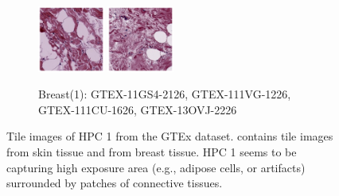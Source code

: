 \documentclass{l4proj}
\begin{document}
\begin{figure}[t]
\begin{subfigure}[b]{\textwidth}
        \includegraphics[width=0.24\textwidth]{images/breast1_3.png}
        \includegraphics[width=0.24\textwidth]{images/breast1_4.png}
        \caption{Breast(1): GTEX-11GS4-2126, GTEX-111VG-1226, GTEX-111CU-1626, GTEX-13OVJ-2226}
        \label{fig:breast1}
    \end{subfigure}
    \caption{Tile images of HPC 1 from the GTEx dataset.  contains tile images from skin tissue and  from breast tissue. HPC 1 seems to be capturing high exposure area (e.g., adipose cells, or artifacts) surrounded by patches of connective tissues. 
    }\label{fig:hpc1}
\end{figure}
\end{document}
